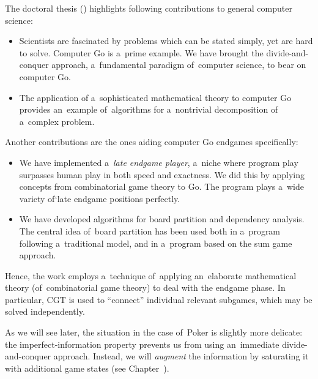 The doctoral thesis (\cite{Muller1995computer}) highlights following contributions to general computer science:
\begin{itemize}
  \item Scientists are fascinated by problems which can be stated simply, yet are hard to solve.
    Computer Go is a~prime example.
    We have brought the divide-and-conquer approach, a~fundamental paradigm of~computer science, to bear on computer Go.

  \item The application of a~sophisticated mathematical theory to computer Go provides an~example of~algorithms for a~nontrivial decomposition of a~complex problem.
\end{itemize}
Another contributions are the ones aiding computer Go endgames specifically:
\begin{itemize}
  \item We have implemented a~\emph{late endgame player}, a~niche where program play surpasses human play in both speed and exactness.
    We did this by applying concepts from combinatorial game theory to Go.
    The program plays a~wide variety of`late endgame positions perfectly.

  \item We have developed algorithms for board partition and dependency analysis.
    The central idea of~board partition has been used both in a~program following a~traditional model, and in a~program based on the sum game approach.
\end{itemize}
Hence, the work employs a~technique of~applying an~elaborate mathematical theory (of~combinatorial game theory) to deal with the endgame phase.
In particular, CGT is used to ``connect'' individual relevant subgames, which may be solved independently.

As we will see later, the situation in the case of~Poker is slightly more delicate:
the imperfect-information property prevents us from using an~immediate divide-and-conquer approach.
Instead, we will \emph{augment} the information by saturating it with additional game states (see Chapter~\todo).

